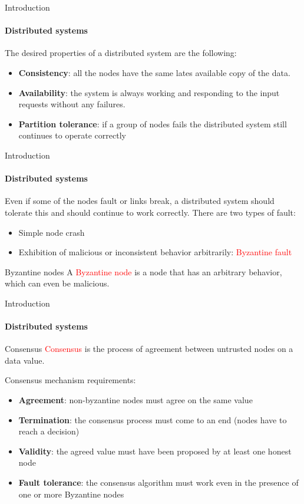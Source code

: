 \documentclass{beamer}
\newcommand\red[1]{\textcolor{red}{#1}}
\begin{document}
  \begin{frame}{Introduction}
    \framesubtitle{Distributed systems}
      The desired properties of a distributed system are the following:\vspace{10pt}
      \begin{itemize}
        \item \textbf{Consistency}: all the nodes have the same lates available copy of the data.
        \item \textbf{Availability}: the system is always working and responding to the
        input requests without any failures.
        \item \textbf{Partition tolerance}: if a group of nodes fails the distributed system
        still continues to operate correctly
      \end{itemize}
  \end{frame}




  \begin{frame}{Introduction}
    \framesubtitle{Distributed systems}
    Even if some of the nodes fault or links break, a distributed system should tolerate
    this and should continue to work correctly. There are two types of fault:
    \begin{itemize}
      \item Simple node crash
      \item Exhibition of malicious or inconsistent behavior arbitrarily: \red{Byzantine fault}
    \end{itemize}

    \begin{block}{Byzantine nodes}
      A \textcolor{red}{Byzantine node} is a node that has an arbitrary behavior,
      which can even be malicious.
    \end{block}
  \end{frame}




  \begin{frame}{Introduction}
    \framesubtitle{Distributed systems}
    \begin{block}{Consensus}
      \red{Consensus} is the process of agreement between untrusted nodes on a data
      value.
    \end{block}

    Consensus mechanism requirements:
    \begin{itemize}
      \item \textbf{Agreement}: non-byzantine nodes must agree on the same value
      \item \textbf{Termination}: the consensus process must come to an end (nodes
      have to reach a decision)
      \item \textbf{Validity}: the agreed value must have been proposed by at
      least one honest node
      \item \textbf{Fault tolerance}: the consensus algorithm must work even
      in the presence of one or more Byzantine nodes
    \end{itemize}
  \end{frame}
\end{document}
